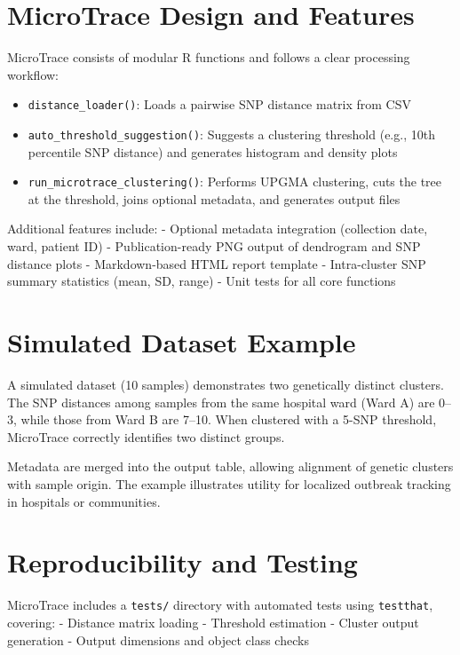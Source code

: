 \section{MicroTrace Design and
Features}\label{microtrace-design-and-features}

MicroTrace consists of modular R functions and follows a clear
processing workflow:

\begin{itemize}
\tightlist
\item
  \texttt{distance\_loader()}: Loads a pairwise SNP distance matrix from
  CSV
\item
  \texttt{auto\_threshold\_suggestion()}: Suggests a clustering
  threshold (e.g., 10th percentile SNP distance) and generates histogram
  and density plots
\item
  \texttt{run\_microtrace\_clustering()}: Performs UPGMA clustering,
  cuts the tree at the threshold, joins optional metadata, and generates
  output files
\end{itemize}

Additional features include: - Optional metadata integration (collection
date, ward, patient ID) - Publication-ready PNG output of dendrogram and
SNP distance plots - Markdown-based HTML report template - Intra-cluster
SNP summary statistics (mean, SD, range) - Unit tests for all core
functions

\section{Simulated Dataset Example}\label{simulated-dataset-example}

A simulated dataset (10 samples) demonstrates two genetically distinct
clusters. The SNP distances among samples from the same hospital ward
(Ward A) are 0--3, while those from Ward B are 7--10. When clustered
with a 5-SNP threshold, MicroTrace correctly identifies two distinct
groups.

Metadata are merged into the output table, allowing alignment of genetic
clusters with sample origin. The example illustrates utility for
localized outbreak tracking in hospitals or communities.

\section{Reproducibility and Testing}\label{reproducibility-and-testing}

MicroTrace includes a \texttt{tests/} directory with automated tests
using \texttt{testthat}, covering: - Distance matrix loading - Threshold
estimation - Cluster output generation - Output dimensions and object
class checks

